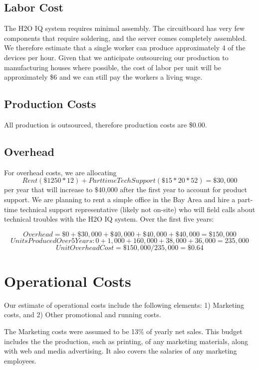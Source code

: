 \documentclass[11pt]{article}
\begin{document}
\subsection{Labor Cost}

The H2O IQ system requires minimal assembly.  The circuitboard has very few components that require soldering, and the server comes completely assembled.  We therefore estimate that a single worker can produce approximately 4 of the devices per hour.  Given that we anticipate outsourcing our production to manufacturing houses where possible, the cost of labor per unit will be approximately \$6 and we can still pay the workers a living wage.

\subsection{Production Costs}

All production is outsourced, therefore production costs are \$0.00.

\subsection{Overhead}

For overhead costs, we are allocating $$Rent (\$1250 * 12) + Part time Tech Support (\$15*20*52) = \$30,000$$ per year that will increase to \$40,000 after the first year to account for product support.  We are planning to rent a simple office in the Bay Area and hire a part-time technical support representative (likely not on-site) who will field calls about technical troubles with the H2O IQ system. Over the first five years:

$$Overhead = \$0 + \$30,000 + \$40,000 + \$40,000 + \$40,000 = \$150,000$$
$$Units Produced Over 5 Years: 0 + 1,000 + 160,000 + 38,000 + 36,000 = 235,000$$
$$Unit Overhead Cost = \$150,000/235,000 = \$0.64$$

\section{Operational Costs}

Our estimate of operational costs include the following elements: 1) Marketing costs, and 2) Other promotional and running costs.

The Marketing costs were assumed to be 13\% of yearly net sales. This budget includes the the production, such as printing, of any marketing materials, along with web and media advertising. It also covers the salaries of any marketing employees.
\end{document}
